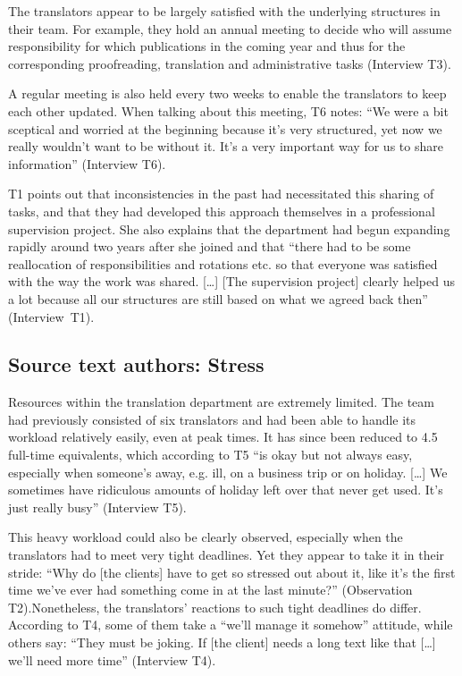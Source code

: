\documentclass[output=paper]{langscibook}
\begin{document}
The translators appear to be largely satisfied with the underlying structures in their team. For example, they hold an annual meeting to decide who will assume responsibility for which publications in the coming year and thus for the corresponding proofreading, translation and administrative tasks (Interview T3).

A regular meeting is also held every two weeks to enable the translators to keep each other updated. When talking about this meeting, T6 notes: “We were a bit sceptical and worried at the beginning because it’s very structured, yet now we really wouldn’t want to be without it. It’s a very important way for us to share information” (Interview T6).

T1 points out that inconsistencies in the past had necessitated this sharing of tasks, and that they had developed this approach themselves in a professional supervision project. She also explains that the department had begun expanding rapidly around two years after she joined and that “there had to be some reallocation of responsibilities and rotations etc. so that everyone was satisfied with the way the work was shared. […] [The supervision project] clearly helped us a lot because all our structures are still based on what we agreed back then” (Interview~T1).

\subsection{Source text authors: Stress}

Resources within the translation department are extremely limited. The team had previously consisted of six translators and had been able to handle its workload relatively easily, even at peak times. It has since been reduced to 4.5 full-time equivalents, which according to T5 “is okay but not always easy, especially when someone’s away, e.g. ill, on a business trip or on holiday. […] We sometimes have ridiculous amounts of holiday left over that never get used. It’s just really busy” (Interview T5).

This heavy workload could also be clearly observed, especially when the translators had to meet very tight deadlines. Yet they appear to take it in their stride: “Why do [the clients] have to get so stressed out about it, like it’s the first time we’ve ever had something come in at the last minute?” (Observation T2).\linebreak Nonetheless, the translators' reactions to such tight deadlines do differ. According to T4, some of them take a “we’ll manage it somehow” attitude, while others say: “They must be joking. If [the client] needs a long text like that […] we’ll need more time” (Interview T4).
\end{document}
